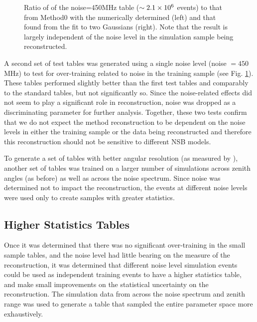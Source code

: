 \documentclass[main.tex]{subfiles}
\begin{document}
\begin{figure}[htbp]
  \centering

  \caption[\disp table reconstruction vs noise.]{Ratio of \rse of the noise=450MHz \disp table ($\sim 2.1\times 10^{6}$ events) to that from Method0 with the numerically determined \rse (left) and that found from the fit to two Gaussians (right). Note that the result is largely independent of the noise level in the simulation sample being reconstructed.}
  \label{fig:disp_ratio_450}
\end{figure}

A second set of test \disp tables was generated using a single noise level (noise $= 450$ MHz) to test for over-training related to noise in the training sample (see Fig. \ref{fig:disp_ratio_450}). These tables performed slightly better than the first test tables and comparably to the standard \disp tables, but not significantly so. Since the noise-related effects did not seem to play a significant role in reconstruction, noise was dropped as a discriminating parameter for further analysis. Together, these two tests confirm that we do not expect the \disp method reconstruction to be dependent on the noise levels in either the training sample or the data being reconstructed and therefore this reconstruction should not be sensitive to different NSB models.

To generate a set of \disp tables with better angular resolution (as measured by \rse\hspace{-4pt}), another set of \disp tables was trained on a larger number of simulations across zenith angles (as before) as well as across the noise spectrum. Since noise was determined not to impact the reconstruction, the events at different noise levels were used only to create samples with greater statistics.

\subsection{Higher Statistics Tables}
Once it was determined that there was no significant over-training in the small sample \disp tables, and the noise level had little bearing on the \rse measure of the reconstruction, it was determined that different noise level simulation events could be used as independent training events to have a higher statistics \disp table, and make small improvements on the statistical uncertainty on the reconstruction. The simulation data from across the noise spectrum and zenith range was used to generate a \disp table that sampled the entire parameter space more exhaustively.
\end{document}
